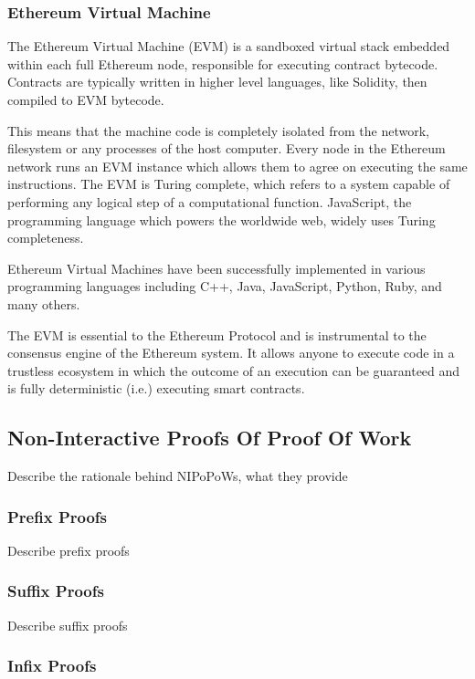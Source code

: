 \documentclass{article}
\begin{document}
  \subsubsection{Ethereum Virtual Machine}

  The Ethereum Virtual Machine (EVM) is a sandboxed virtual stack
  embedded within each full Ethereum node, responsible for executing
  contract bytecode. Contracts are typically written in higher level
  languages, like Solidity, then compiled to EVM bytecode.

  This means that the machine code is completely isolated from the
  network, filesystem or any processes of the host computer. Every node
  in the Ethereum network runs an EVM instance which allows them to
  agree on executing the same instructions. The EVM is Turing complete,
  which refers to a system capable of performing any logical step of a
  computational function. JavaScript, the programming language which
  powers the worldwide web, widely uses Turing completeness.

  Ethereum Virtual Machines have been successfully implemented in
  various programming languages including C++, Java, JavaScript, Python,
  Ruby, and many others.

  The EVM is essential to the Ethereum Protocol and is instrumental to
  the consensus engine of the Ethereum system. It allows anyone to
  execute code in a trustless ecosystem in which the outcome of an
  execution can be guaranteed and is fully deterministic (i.e.)
  executing smart contracts.

  \subsection{Non-Interactive Proofs Of Proof Of Work}

  Describe the rationale behind NIPoPoWs, what they provide

  \subsubsection{Prefix Proofs}

  Describe prefix proofs

  \subsubsection{Suffix Proofs}

  Describe suffix proofs

  \subsubsection{Infix Proofs}
\end{document}
